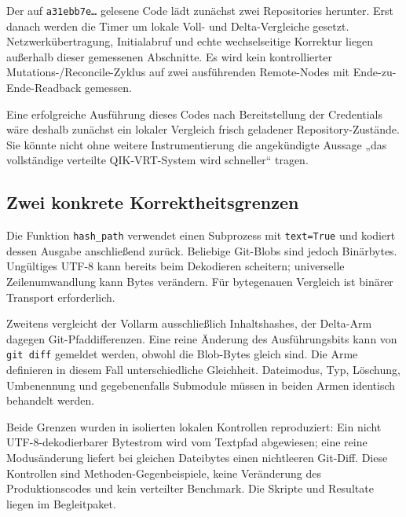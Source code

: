 \begin{cols}
Der auf \texttt{a31ebb7e…} gelesene Code lädt zunächst zwei Repositories herunter. Erst danach werden die Timer um lokale Voll- und Delta-Vergleiche gesetzt. Netzwerkübertragung, Initialabruf und echte wechselseitige Korrektur liegen außerhalb dieser gemessenen Abschnitte. Es wird kein kontrollierter Mutations-/Reconcile-Zyklus auf zwei ausführenden Remote-Nodes mit Ende-zu-Ende-Readback gemessen. 

Eine erfolgreiche Ausführung dieses Codes nach Bereitstellung der Credentials wäre deshalb zunächst ein lokaler Vergleich frisch geladener Repository-Zustände. Sie könnte nicht ohne weitere Instrumentierung die angekündigte Aussage „das vollständige verteilte QIK-VRT-System wird schneller“ tragen.

\subsection*{Zwei konkrete Korrektheitsgrenzen}
Die Funktion \texttt{hash\_path} verwendet einen Subprozess mit \texttt{text=True} und kodiert dessen Ausgabe anschließend zurück. Beliebige Git-Blobs sind jedoch Binärbytes. Ungültiges UTF-8 kann bereits beim Dekodieren scheitern; universelle Zeilenumwandlung kann Bytes verändern. Für bytegenauen Vergleich ist binärer Transport erforderlich. 

Zweitens vergleicht der Vollarm ausschließlich Inhaltshashes, der Delta-Arm dagegen Git-Pfaddifferenzen. Eine reine Änderung des Ausführungsbits kann von \texttt{git diff} gemeldet werden, obwohl die Blob-Bytes gleich sind. Die Arme definieren in diesem Fall unterschiedliche Gleichheit. Dateimodus, Typ, Löschung, Umbenennung und gegebenenfalls Submodule müssen in beiden Armen identisch behandelt werden.

Beide Grenzen wurden in isolierten lokalen Kontrollen reproduziert: Ein nicht UTF-8-dekodierbarer Bytestrom wird vom Textpfad abgewiesen; eine reine Modusänderung liefert bei gleichen Dateibytes einen nichtleeren Git-Diff. Diese Kontrollen sind Methoden-Gegenbeispiele, keine Veränderung des Produktionscodes und kein verteilter Benchmark. Die Skripte und Resultate liegen im Begleitpaket. 


\end{cols}
